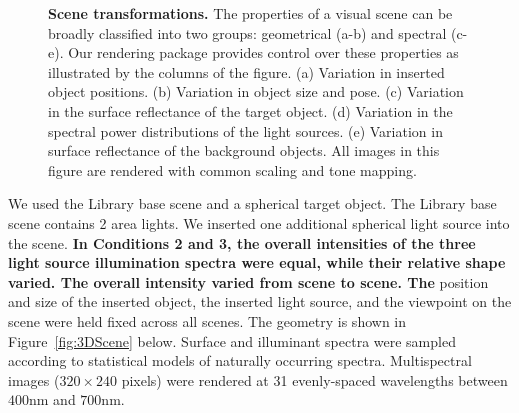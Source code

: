 \documentclass{jov}
\providecommand{\DIFaddtex}[1]{{\bf #1}} %
\providecommand{\DIFdeltex}[1]{} %
\providecommand{\DIFaddbegin}{} %
\providecommand{\DIFaddend}{} %
\providecommand{\DIFdelbegin}{} %
\providecommand{\DIFdelend}{} %
\providecommand{\DIFadd}[1]{\texorpdfstring{\DIFaddtex{#1}}{#1}} %
\providecommand{\DIFdel}[1]{\texorpdfstring{\DIFdeltex{#1}}{}} %
\newcommand{\DIFscaledelfig}{0.5}
\newlength{\DIFdelgraphicswidth} %
\newlength{\DIFdelgraphicsheight} %
\newcommand{\DIFaddincludegraphics}[2][]{{\color{blue}\fbox{\DIFOincludegraphics[#1]{#2}}}} %
\newcommand{\DIFdelincludegraphics}[2][]{%
\sbox{\DIFdelgraphicsbox}{\DIFOincludegraphics[#1]{#2}}%
\settoboxwidth{\DIFdelgraphicswidth}{\DIFdelgraphicsbox} %
\settoboxtotalheight{\DIFdelgraphicsheight}{\DIFdelgraphicsbox} %
\scalebox{\DIFscaledelfig}{%
\parbox[b]{\DIFdelgraphicswidth}{\usebox{\DIFdelgraphicsbox}\\[-\baselineskip] \rule{\DIFdelgraphicswidth}{0em}}\llap{\resizebox{\DIFdelgraphicswidth}{\DIFdelgraphicsheight}{%
\setlength{\unitlength}{\DIFdelgraphicswidth}%
\begin{picture}(1,1)%
\thicklines\linethickness{2pt} %
{\color[rgb]{1,0,0}\put(0,0){\framebox(1,1){}}}%
{\color[rgb]{1,0,0}\put(0,0){\line( 1,1){1}}}%
{\color[rgb]{1,0,0}\put(0,1){\line(1,-1){1}}}%
\end{picture}%
}\hspace*{3pt}}} %
} %
\DeclareRobustCommand{\DIFaddbegin}{\DIFOaddbegin \let\includegraphics\DIFaddincludegraphics} %
\DeclareRobustCommand{\DIFaddend}{\DIFOaddend \let\includegraphics\DIFOincludegraphics} %
\DeclareRobustCommand{\DIFdelbegin}{\DIFOdelbegin \let\includegraphics\DIFdelincludegraphics} %
\DeclareRobustCommand{\DIFdelend}{\DIFOaddend \let\includegraphics\DIFOincludegraphics} %
\begin{document}
\begin{figure}
    \caption{{\bf Scene transformations.} The properties of a visual scene can be broadly classified into two groups: geometrical (a-b) and spectral (c-e). Our rendering package provides control over these properties as illustrated by the columns of the figure. (a) Variation in inserted object positions. (b) Variation in object size and pose. (c) Variation in the surface reflectance of the target object. (d) Variation in the spectral power distributions of the light sources. (e) Variation in surface reflectance of the background objects. All images in this figure are rendered with common scaling and tone mapping.
\label{fig:VWCCTransformations}}
\end{figure}

We used the Library base scene and a spherical target object.
The Library base scene contains 2 area lights. 
We inserted one additional spherical light source into the scene.
\DIFdelbegin \DIFdel{The }\DIFdelend \DIFaddbegin \DIFadd{In Conditions 2 and 3, the overall intensities of the three light source illumination spectra were equal, while their relative shape varied. 
The overall intensity varied from scene to scene.
The }\DIFaddend position and size of the inserted object, the inserted light source, and the viewpoint on the scene were held fixed across all 
scenes. The geometry is shown in Figure~\ref{fig:3DScene} below.
Surface and illuminant spectra were sampled according to statistical models of naturally occurring spectra.
Multispectral images ($320 \times 240$ pixels) were rendered at 31 evenly-spaced wavelengths between $400$nm and $700$nm.
\end{document}
